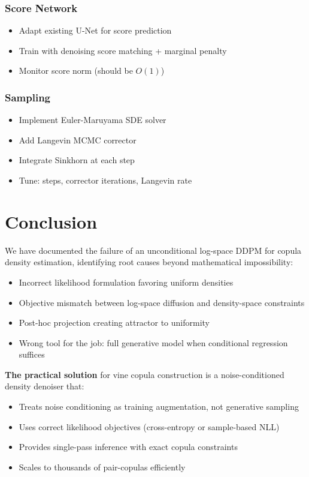 \documentclass[11pt]{article}
\begin{document}
\subsubsection{Score Network}
\begin{itemize}
    \item[$\square$] Adapt existing U-Net for score prediction
    \item[$\square$] Train with denoising score matching + marginal penalty
    \item[$\square$] Monitor score norm (should be $O(1)$)
\end{itemize}

\subsubsection{Sampling}
\begin{itemize}
    \item[$\square$] Implement Euler-Maruyama SDE solver
    \item[$\square$] Add Langevin MCMC corrector
    \item[$\square$] Integrate Sinkhorn at each step
    \item[$\square$] Tune: steps, corrector iterations, Langevin rate
\end{itemize}

\section{Conclusion}

We have documented the failure of an unconditional log-space DDPM for copula density estimation, identifying root causes beyond mathematical impossibility:
\begin{itemize}
    \item Incorrect likelihood formulation favoring uniform densities
    \item Objective mismatch between log-space diffusion and density-space constraints
    \item Post-hoc projection creating attractor to uniformity
    \item Wrong tool for the job: full generative model when conditional regression suffices
\end{itemize}

\textbf{The practical solution} for vine copula construction is a noise-conditioned density denoiser that:
\begin{itemize}
    \item Treats noise conditioning as training augmentation, not generative sampling
    \item Uses correct likelihood objectives (cross-entropy or sample-based NLL)
    \item Provides single-pass inference with exact copula constraints
    \item Scales to thousands of pair-copulas efficiently
\end{itemize}
\end{document}
